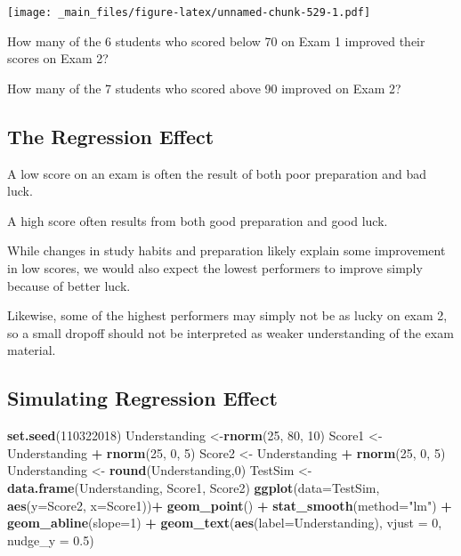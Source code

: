 \documentclass[]{book}
\newenvironment{Shaded}{\begin{snugshade}}{\end{snugshade}}
\newcommand{\KeywordTok}[1]{\textcolor[rgb]{0.13,0.29,0.53}{\textbf{#1}}}
\newcommand{\DataTypeTok}[1]{\textcolor[rgb]{0.13,0.29,0.53}{#1}}
\newcommand{\DecValTok}[1]{\textcolor[rgb]{0.00,0.00,0.81}{#1}}
\newcommand{\FloatTok}[1]{\textcolor[rgb]{0.00,0.00,0.81}{#1}}
\newcommand{\StringTok}[1]{\textcolor[rgb]{0.31,0.60,0.02}{#1}}
\newcommand{\OperatorTok}[1]{\textcolor[rgb]{0.81,0.36,0.00}{\textbf{#1}}}
\newcommand{\NormalTok}[1]{#1}
\begin{document}
\texttt{[image: \_main\_files/figure-latex/unnamed-chunk-529-1.pdf]}

How many of the 6 students who scored below 70 on Exam 1 improved their
scores on Exam 2?

How many of the 7 students who scored above 90 improved on Exam 2?

\subsection{The Regression Effect}\label{the-regression-effect-3}

A low score on an exam is often the result of both poor preparation and
bad luck.

A high score often results from both good preparation and good luck.

While changes in study habits and preparation likely explain some
improvement in low scores, we would also expect the lowest performers to
improve simply because of better luck.

Likewise, some of the highest performers may simply not be as lucky on
exam 2, so a small dropoff should not be interpreted as weaker
understanding of the exam material.

\subsection{Simulating Regression
Effect}\label{simulating-regression-effect}

\begin{Shaded}
\begin{Highlighting}[]
\KeywordTok{set.seed}\NormalTok{(}\DecValTok{110322018}\NormalTok{)}
\NormalTok{Understanding <-}\KeywordTok{rnorm}\NormalTok{(}\DecValTok{25}\NormalTok{, }\DecValTok{80}\NormalTok{, }\DecValTok{10}\NormalTok{)}
\NormalTok{Score1 <-}\StringTok{ }\NormalTok{Understanding }\OperatorTok{+}\StringTok{ }\KeywordTok{rnorm}\NormalTok{(}\DecValTok{25}\NormalTok{, }\DecValTok{0}\NormalTok{, }\DecValTok{5}\NormalTok{)}
\NormalTok{Score2 <-}\StringTok{ }\NormalTok{Understanding }\OperatorTok{+}\StringTok{ }\KeywordTok{rnorm}\NormalTok{(}\DecValTok{25}\NormalTok{, }\DecValTok{0}\NormalTok{, }\DecValTok{5}\NormalTok{)}
\NormalTok{Understanding <-}\StringTok{ }\KeywordTok{round}\NormalTok{(Understanding,}\DecValTok{0}\NormalTok{)}
\NormalTok{TestSim <-}\StringTok{ }\KeywordTok{data.frame}\NormalTok{(Understanding, Score1, Score2)}
\KeywordTok{ggplot}\NormalTok{(}\DataTypeTok{data=}\NormalTok{TestSim, }\KeywordTok{aes}\NormalTok{(}\DataTypeTok{y=}\NormalTok{Score2, }\DataTypeTok{x=}\NormalTok{Score1))}\OperatorTok{+}\StringTok{ }\KeywordTok{geom_point}\NormalTok{() }\OperatorTok{+}\StringTok{ }\KeywordTok{stat_smooth}\NormalTok{(}\DataTypeTok{method=}\StringTok{"lm"}\NormalTok{) }\OperatorTok{+}
\StringTok{  }\KeywordTok{geom_abline}\NormalTok{(}\DataTypeTok{slope=}\DecValTok{1}\NormalTok{) }\OperatorTok{+}\StringTok{ }\KeywordTok{geom_text}\NormalTok{(}\KeywordTok{aes}\NormalTok{(}\DataTypeTok{label=}\NormalTok{Understanding), }\DataTypeTok{vjust =} \DecValTok{0}\NormalTok{, }\DataTypeTok{nudge_y =} \FloatTok{0.5}\NormalTok{)}
\end{Highlighting}
\end{Shaded}
\end{document}
